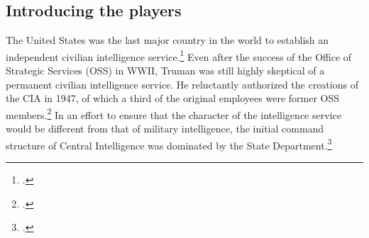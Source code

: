 \documentclass[11pt]{memoir}
\begin{document}
\begin{refsegment}


\subsection{Introducing the players}


The United States was the last major country in the world to establish an independent civilian intelligence service.\footcite[p.~35]{olson_fair_2006} Even after the success of the Office of Strategic Services (OSS) in WWII, Truman was still highly skeptical of a permanent civilian intelligence service. He reluctantly authorized the creations of the CIA in 1947, of which a third of the original employees were former OSS members.\footcite[p.~37]{olson_fair_2006} In an effort to ensure that the character of the intelligence service would be different from that of military intelligence, the initial command structure of Central Intelligence was dominated by the State Department.\footcite{troy_truman_1993}


\end{refsegment}
\end{document}
